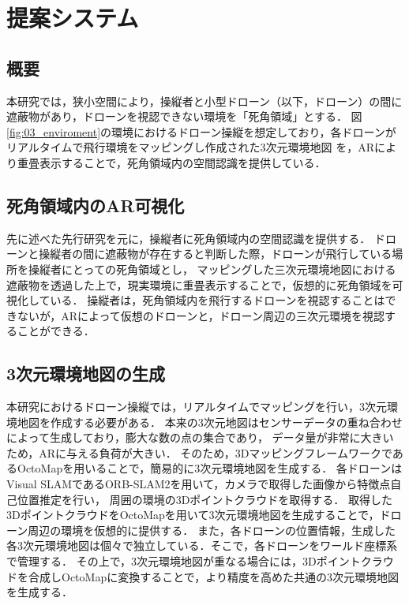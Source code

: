\documentclass[a4paper,10pt,twocolumn,uplatex]{jsarticle}
\begin{document}

\section{提案システム}
\subsection{概要}
本研究では，狭小空間により，操縦者と小型ドローン（以下，ドローン）の間に遮蔽物があり，ドローンを視認できない環境を「死角領域」とする．
図\ref{fig:03_enviroment}の環境におけるドローン操縦を想定しており，各ドローンがリアルタイムで飛行環境をマッピングし作成された3次元環境地図
を，ARにより重畳表示することで，死角領域内の空間認識を提供している．
\par

\subsection{死角領域内のAR可視化}
先に述べた先行研究\cite{Erat}を元に，操縦者に死角領域内の空間認識を提供する．
ドローンと操縦者の間に遮蔽物が存在すると判断した際，ドローンが飛行している場所を操縦者にとっての死角領域とし，
マッピングした三次元環境地図における遮蔽物を透過した上で，現実環境に重畳表示することで，仮想的に死角領域を可視化している．
操縦者は，死角領域内を飛行するドローンを視認することはできないが，ARによって仮想のドローンと，ドローン周辺の三次元環境を視認することができる．

\subsection{3次元環境地図の生成}
本研究におけるドローン操縦では，リアルタイムでマッピングを行い，3次元環境地図を作成する必要がある．
本来の3次元地図はセンサーデータの重ね合わせによって生成しており，膨大な数の点の集合であり，
データ量が非常に大きいため，ARに与える負荷が大きい．
そのため，3DマッピングフレームワークであるOctoMapを用いることで，簡易的に3次元環境地図を生成する．
各ドローンはVisual SLAMであるORB-SLAM2を用いて，カメラで取得した画像から特徴点自己位置推定を行い，
周囲の環境の3Dポイントクラウドを取得する．
取得した3DポイントクラウドをOctoMapを用いて3次元環境地図を生成することで，ドローン周辺の環境を仮想的に提供する．
また，各ドローンの位置情報，生成した各3次元環境地図は個々で独立している．そこで，各ドローンをワールド座標系で管理する．
その上で，3次元環境地図が重なる場合には，3Dポイントクラウドを合成しOctoMapに変換することで，より精度を高めた共通の3次元環境地図を生成する．
\end{document}
